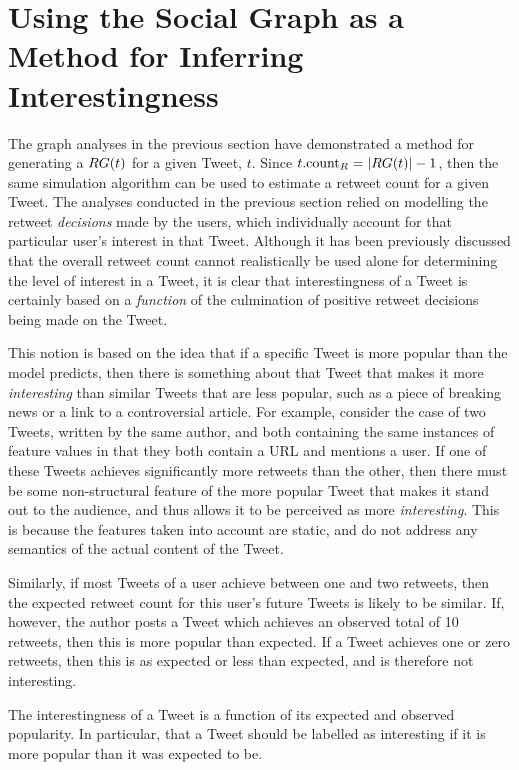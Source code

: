 \section{Using the Social Graph as a Method for Inferring Interestingness}
The graph analyses in the previous section have demonstrated a method for generating a $RG(t)$ for a given Tweet, $t$. Since $t.\textrm{count}_R = |RG(t)| - 1$, then the same simulation algorithm can be used to estimate a retweet count for a given Tweet. The analyses conducted in the previous section relied on modelling the retweet \textit{decisions} made by the users, which individually account for that particular user's interest in that Tweet. Although it has been previously discussed that the overall retweet count cannot realistically be used alone for determining the level of interest in a Tweet, it is clear that interestingness of a Tweet is certainly based on a \textit{function} of the culmination of positive retweet decisions being made on the Tweet.

This notion is based on the idea that if a specific Tweet is more popular than the model predicts, then there is something about that Tweet that makes it more \textit{interesting} than similar Tweets that are less popular, such as a piece of breaking news or a link to a controversial article. For example, consider the case of two Tweets, written by the same author, and both containing the same instances of feature values in that they both contain a URL and mentions a user. If one of these Tweets achieves significantly more retweets than the other, then there must be some non-structural feature of the more popular Tweet that makes it stand out to the audience, and thus allows it to be perceived as more \textit{interesting}. This is because the features taken into account are static, and do not address any semantics of the actual content of the Tweet.

Similarly, if most Tweets of a user achieve between one and two retweets, then the expected retweet count for this user's future Tweets is likely to be similar. If, however, the author posts a Tweet which achieves an observed total of 10 retweets, then this is more popular than expected. If a Tweet achieves one or zero retweets, then this is as expected or less than expected, and is therefore not interesting.

\begin{myproposition}
\label{proposition:1}
The interestingness of a Tweet is a function of its expected and observed popularity. In particular, that a Tweet should be labelled as interesting if it is more popular than it was expected to be.
\end{myproposition}

